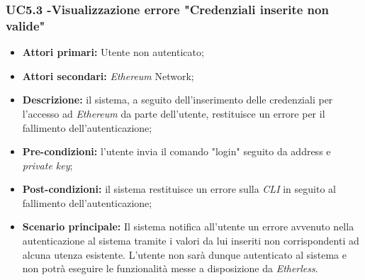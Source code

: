 \subsubsection{UC5.3 -Visualizzazione errore "Credenziali inserite non valide"}
\begin{itemize}
	\item \textbf{Attori primari:} Utente non autenticato;
    \item \textbf{Attori secondari:} \textit{Ethereum\glo} Network;
	\item \textbf{Descrizione:} il sistema, a seguito dell'inserimento delle credenziali per l'accesso ad \textit{Ethereum\glo} da parte dell'utente, restituisce un errore per il fallimento dell'autenticazione;
	\item \textbf{Pre-condizioni:} l'utente invia il comando "login" seguito da address e \textit{private key\glos};
	\item \textbf{Post-condizioni:} il sistema restituisce un errore sulla \textit{CLI\glo} in seguito al fallimento dell'autenticazione;
	\item \textbf{Scenario principale:} Il sistema notifica all'utente un errore avvenuto nella autenticazione al sistema tramite i valori da lui inseriti non corrispondenti ad alcuna utenza esistente. L'utente non sarà dunque autenticato al sistema e non potrà eseguire le funzionalità messe a disposizione da \textit{Etherless}.
\end{itemize}
